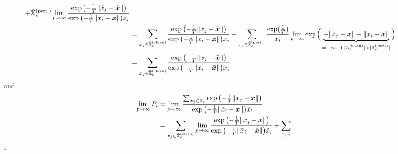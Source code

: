 \documentclass{article} %
\newcommand{\pertmset}{\tilde{\sX}_\epsilon}
\newenvironment{proof}{}{$\square$}
\begin{document}
\begin{proof}
\begin{equation}
\begin{aligned}
{         + \pertmset^{(\text{pert.})}} \lim_{p \to \infty} \frac{ \exp{\left (-\frac{1}{T} \|\tilde{\evx}_j - \bar{\vx}\| \right )}}{\exp{\left(-\frac{1}{T} \|\evx_i - \bar{\vx}\| \right )} \evx_i } \\
        &= \sum_{\evx_j \in \pertmset^{(\text{clean})}} \frac{ \exp{\left (-\frac{1}{T} \|\evx_j - \bar{\vx}\| \right )}}{\exp{\left(-\frac{1}{T} \|\evx_i - \bar{\vx}\| \right )} \evx_i } + \sum_{\evx_j \in \pertmset^{(\text{pert.})}}  \frac{\exp(\frac{1}{T})}{\evx_i } \lim_{p \to \infty} \exp{\Big( \underbrace{-\|\tilde{\evx}_j - \bar{\vx}\| + \|\evx_i - \bar{\vx}\|}_{=-\infty,\;\;\text{if} |\pertmset^{(\text{clean})}| > |\pertmset^{(\text{pert.})}|} \Big)  } \\  
        &= \sum_{\evx_j \in \pertmset^{(\text{clean})}} \frac{ \exp{\left (-\frac{1}{T} \|\evx_j - \bar{\vx}\| \right )}}{\exp{\left(-\frac{1}{T} \|\evx_i - \bar{\vx}\| \right )} \evx_i } \\
        \end{aligned} 
    \end{equation}
    and
    \begin{equation}\label{eq:proof3}
        \begin{aligned}
         \lim_{p \to \infty} P_i 
         &= \lim_{p \to \infty} \frac{\sum_{\evx_j \in \pertmset} \exp{\left (-\frac{1}{T} \|\evx_j - \bar{\vx}\| \right )}}{\exp{\left(-\frac{1}{T} \|\tilde{\evx}_i - \bar{\vx}\| \right )} \tilde{\evx}_i } \\
         &= \sum_{\evx_j \in \pertmset^{(\text{clean})}} \lim_{p \to \infty} \frac{ \exp{\left (-\frac{1}{T} \|\evx_j - \bar{\vx}\| \right )}}{\exp{\left(-\frac{1}{T} \|\tilde{\evx}_i - \bar{\vx}\| \right )} \tilde{\evx}_i } + \sum_{\evx_j \in 
}
\end{aligned}
\end{equation}
\end{proof}
\end{document}

